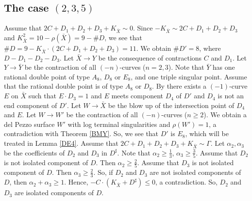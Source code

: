 \documentclass[10pt,oneside,reqno]{amsart}
\theoremstyle{definition}
\theoremstyle{remark}
\numberwithin{equation}{section}
\begin{document}
\subsection{The case $(2,3,5)$}
Assume that $2C+D_1+D_2+D_3+K_{\bar{X}}\sim 0$. Since $-K_{\bar{X}}\sim 2C+D_1+D_2+D_3$ and $K_{\bar{X}}^2=10-\rho(\bar{X})=9-\# D$, we see that $\#D=9-K_{\bar{X}}\cdot(2C+D_1+D_2+D_3)=11$. We obtain $\# D'=8$, where $D-D_1-D_2-D_3$. Let $\bar{X}\rightarrow Y$ be the consequence of contractions $C$ and $D_1$. Let $Y\rightarrow\bar{Y}$ be the contraction of all $(-n)$-curves ($n=2,3$). Note that $\bar{Y}$ has one rational double point of type $A_8$, $D_8$ or $E_8$, and one triple singular point. Assume that the rational double point is of type $A_8$ or $D_8$. By {\cite{Zan}} there exists a $(-1)$-curve $E$ on $\bar{X}$ such that $E\cdot D_3=1$ and $E$ meets component $D_4$ of $D'$ and $D_4$ is not an end component of $D'$. Let $W\rightarrow\bar{X}$ be the blow up of the intersection point of $D_4$ and $E$. Let $W\rightarrow W'$ be the contraction of all $(-n)$-curves ($n\geq 2$). We obtain a del Pezzo surface $W'$ with log terminal singularities and $\rho(W')=1$, a contradiction with Theorem \ref{BMY}. So, we see that $D'$ is $E_8$, which will be treated in  Lemma \ref{DE4}. Assume that $2C+D_1+D_2+D_3+K_{\bar{X}}\sim \Gamma$. Let $\alpha_2,\alpha_3$ be the coefficients of $D_2$ and $D_3$ in $D^\sharp$. Note that $\alpha_2\geq\frac{1}{3}$, $\alpha_3\geq\frac{3}{5}$. Assume that $D_2$ is not isolated component of $D$. Then $\alpha_2\geq\frac{2}{5}$. Assume that $D_3$ is not isolated component of $D$. Then $\alpha_3\geq\frac{2}{3}$. So, if $D_2$ and $D_3$ are not isolated components of $D$, then $\alpha_2+\alpha_3\geq 1$. Hence, $-C\cdot(K_{\bar{X}}+D^{\sharp})\leq 0$, a contradiction. So, $D_2$ and $D_3$ are isolated components of $D$.
\end{document}
